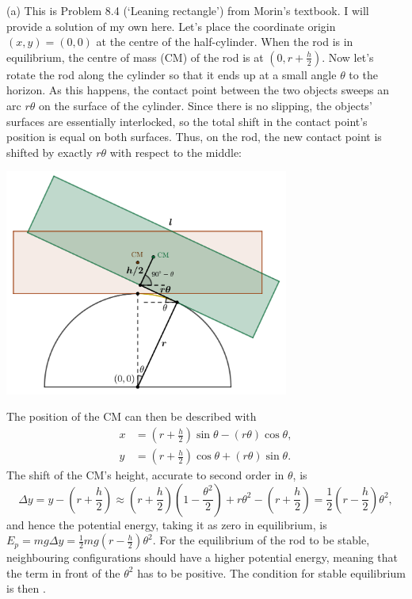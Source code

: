 \documentclass[../TST.tex]{subfiles}
\begin{document}
\begin{solution} (a) This is Problem 8.4 (`Leaning rectangle') from Morin's textbook. I will provide a solution of my own here. Let's place the coordinate origin $(x,y)=(0,0)$ at the centre of the half-cylinder. When the rod is in equilibrium, the centre of mass (CM) of the rod is at $(0,r+\frac{h}{2})$. Now let's rotate the rod along the cylinder so that it ends up at a small angle $\theta$ to the horizon. As this happens, the contact point between the two objects sweeps an arc $r\theta$ on the surface of the cylinder. Since there is no slipping, the objects' surfaces are essentially interlocked, so the total shift in the contact point's position is equal on both surfaces.  Thus, on the rod, the new contact point is shifted by exactly $r\theta$ with respect to the middle:
\begin{center}
\includegraphics[width=0.7\textwidth]{fig/a2016_s1.pdf}
\end{center}
The position of the CM can then be described with
\begin{align*}
	x&=\left(r+\frac{h}{2}\right) \sin{\theta}-(r\theta)\cos{\theta},\\
	y&=\left(r+\frac{h}{2}\right) \cos{\theta}+(r\theta)\sin{\theta}.
\end{align*}
The shift of the CM's height, accurate to second order in $\theta$, is
\begin{equation*}
\Delta y = y-\left(r+\frac{h}{2}\right) \approx \left(r+\frac{h}{2}\right)\left(1-\frac{\theta^2}{2}\right) +r\theta^2-\left(r+\frac{h}{2}\right) = \frac{1}{2}\left(r-\frac{h}{2}\right) \theta^2,
\end{equation*}
and hence the potential energy, taking it as zero in equilibrium, is $E_p=mg\Delta y=\frac{1}{2}mg \left(r-\frac{h}{2}\right) \theta^2$. For the equilibrium of the rod to be stable, neighbouring configurations should have a higher potential energy, meaning that the term in front of the $\theta^2$ has to be positive. The condition for stable equilibrium is then .\\


\end{solution}
\end{document}
